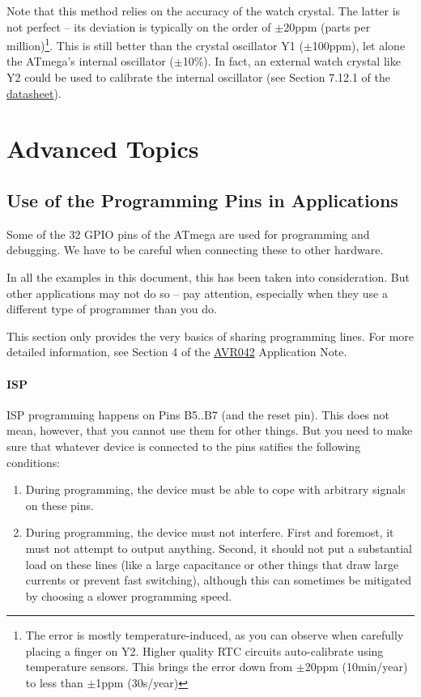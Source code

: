 \documentclass{article}
\newenvironment{note}{\begin{tcolorbox}[colback=blue!5!white,colframe=blue!75!black,title=\textbf{Note}]}{\end{tcolorbox}}
\newcommand{\datasheet}{\href{https://ww1.microchip.com/downloads/en/DeviceDoc/doc2593.pdf}{datasheet}}
\begin{document}
Note that this method relies on the accuracy of the watch crystal. The latter is not perfect -- its deviation is typically on the order of $\pm$20ppm (parts per million)\footnote{The error is mostly temperature-induced, as you can observe when carefully placing a finger on Y2. Higher quality RTC circuits auto-calibrate using temperature sensors. This brings the error down from $\pm$20ppm (10min/year) to less than $\pm$1ppm (30s/year)}. This is still better than the crystal oscillator Y1 ($\pm$100ppm), let alone the ATmega's internal oscillator ($\pm$10\%). In fact, an external watch crystal like Y2 could be used to calibrate the internal oscillator (see Section 7.12.1 of the \datasheet). 

\section{Advanced Topics}
\subsection{Use of the Programming Pins in Applications}
Some of the 32 GPIO pins of the ATmega are used for programming and debugging. We have to be careful when connecting these to other hardware. 

\begin{note}
In all the examples in this document, this has been taken into consideration. But other applications may not do so -- pay attention, especially when they use a different type of programmer than you do. 
\end{note}

This section only provides the very basics of sharing programming lines. For more detailed information, see Section 4 of the \href{https://ww1.microchip.com/downloads/en/appnotes/atmel-2521-avr-hardware-design-considerations_applicationnote_avr042.pdf}{AVR042} Application Note. 

\paragraph{ISP} ISP programming happens on Pins B5..B7 (and the reset pin). This does not mean, however, that you cannot use them for other things. But you need to make sure that whatever device is connected to the pins satifies the following conditions:
\begin{enumerate}
\item During programming, the device must be able to cope with arbitrary signals on these pins. 
\item During programming, the device must not interfere. First and foremost, it must not attempt to output anything. Second, it should not put a substantial load on these lines (like a large capacitance or other things that draw large currents or prevent fast switching), although this can sometimes be mitigated by choosing a slower programming speed. 
\end{enumerate}
\end{document}
